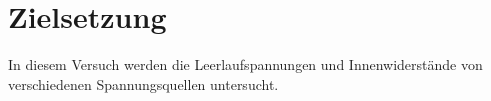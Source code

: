 \section{Zielsetzung}
\label{sec:Zielsetzung}

In diesem Versuch werden die Leerlaufspannungen und Innenwiderstände von verschiedenen
Spannungsquellen untersucht.
